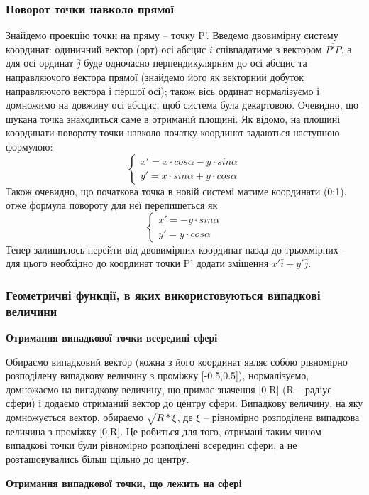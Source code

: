 \documentclass[a4paper,12pt]{article}
\begin{document}
\subsubsection{Поворот точки навколо прямої}
Знайдемо проекцію точки на пряму -- точку P'. Введемо двовимірну систему координат: одиничний вектор (орт) осі абсцис $\bar i$ співпадатиме з вектором $\overline{P'P}$, а для осі ординат $\bar j$ буде одночасно перпендикулярним до осі абсцис та направляючого вектора прямої (знайдемо його як векторний добуток направляючого вектора і першої осі); також вісь ординат нормалізуємо і домножимо на довжину осі абсцис, щоб система була декартовою. Очевидно, що шукана точка знаходиться саме в отриманій площині. Як відомо, на площині координати повороту точки навколо початку координат задаються наступною формулою:
\[
  \begin{cases}
    x' = x \cdot cos \alpha - y \cdot sin \alpha \\
    y' = x \cdot sin \alpha + y \cdot cos \alpha
  \end{cases}
\]
 Також очевидно, що початкова точка в новій системі матиме координати (0;1), отже формула повороту для неї перепишеться як
\[
  \begin{cases}
    x' = - y \cdot sin \alpha \\
    y' = y \cdot cos \alpha
  \end{cases}
\]
Тепер залишилось перейти від двовимірних координат назад до трьохмірних -- для цього необхідно до координат точки P' додати зміщення $x' \bar i + y' \bar j$.

\subsubsection{Геометричні функції, в яких використовуються випадкові величини}
\textbf{Отримання випадкової точки всередині сфері}

Обираємо випадковий вектор (кожна з його координат являє собою рівномірно розподілену випадкову величину з проміжку [-0.5,0.5]), нормалізуємо, домножаємо на випадкову величину, що примає значення [0,R] (R -- радіус сфери) і додаємо отриманий вектор до центру сфери. Випадкову величину, на яку домножується вектор, обираємо $\sqrt{R*\xi}$, де $\xi$ -- рівномірно розподілена випадкова величина з проміжку [0,R]. Це робиться для того, отримані таким чином випадкові точки були рівномірно розподілені всередині сфери, а не розташовувались більш щільно до центру.

\textbf{Отримання випадкової точки, що лежить на сфері}
\end{document}
